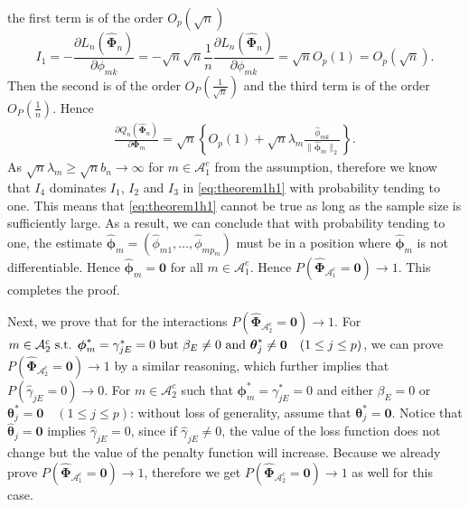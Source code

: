 \documentclass[a4paper,fleqn]{cas-sc}
\newcommand{\Op}{O_{P}}
\newcommand{\ddd}{,\ldots,}
\newcommand{\btheta}{\boldsymbol{\theta}}
\newcommand{\A}{\mathcal{A}}
\begin{document}
{	the first term is of the order $O_{p}(\sqrt{n})$
	\[
	I_{1}=-\frac{\partial L_{n}\left(\widehat{\boldsymbol{\Phi}}_{n}\right)}{\partial\phi_{mk}}=-\sqrt{n}\sqrt{n}\frac{1}{n}\frac{\partial L_{n}\left(\widehat{\boldsymbol{\Phi}}_{n}\right)}{\partial\phi_{mk}}=\sqrt{n}O_{p}(1)=O_{p}(\sqrt{n}).
	\]
	Then the second is of the order $\Op\left(\frac{1}{\sqrt{n}}\right)$
	and the third term is of the order $\Op\left(\frac{1}{n}\right)$.
	Hence
	\begin{align}
	\frac{\partial Q_{n}\left(\widehat{\boldsymbol{\Phi}}_{n}\right)}{\partial\boldsymbol{\Phi}_{m}}=\sqrt{n}\left\{ O_{p}(1)+\sqrt{n}\lambda_{m}\frac{\hat{\phi}_{mk}}{\|\widehat{\boldsymbol{\phi}}_{m}\|_{2}}\right\} .\label{eq:theorem1h1}
	\end{align}
	As $\sqrt{n}\lambda_{m}\geq\sqrt{n}b_{n}\to\infty$ for $m\in\mathcal{A}_{1}^{c}$
	from the assumption, therefore we know that $I_{4}$ dominates $I_{1}$,
	$I_{2}$ and $I_{3}$ in \eqref{eq:theorem1h1} with probability tending
	to one. This means that \eqref{eq:theorem1h1} cannot be true as long
	as the sample size is sufficiently large. As a result, we can conclude
	that with probability tending to one, the estimate $\widehat{\boldsymbol{\phi}}_{m}=(\hat{\phi}_{m1}\ddd\hat{\phi}_{mp_{m}})$
	must be in a position where $\widehat{\boldsymbol{\phi}}_{m}$ is
	not differentiable. Hence $\widehat{\boldsymbol{\phi}}_{m}=\mathbf{0}$
	for all $m\in\A_{1}^{c}$. Hence $P\left(\widehat{\boldsymbol{\Phi}}_{\mathcal{\A}_{1}^{c}}=\mathbf{0}\right)\rightarrow1$.
	This completes the proof. }{\normalsize\par}

{\normalsize{}Next, we prove that for the interactions $P\left(\widehat{\boldsymbol{\Phi}}_{\mathcal{\A}_{2}^{c}}=\mathbf{0}\right)\rightarrow1$.
	For $m\in\A_{2}^{c}\text{ s.t. }\text{\ensuremath{\boldsymbol{\phi}_{m}^{*}}}=\gamma_{jE}^{*}=0\text{ but }\beta_{E}\neq0\text{ and }\btheta_{j}^{*}\neq\mathbf{0}\quad(1\leq j\leq p)$,
	we can prove $P\left(\widehat{\boldsymbol{\Phi}}_{\mathcal{\A}_{2}^{c}}=\mathbf{0}\right)\rightarrow1$
	by a similar reasoning, which further implies that $P(\hat{\gamma}_{jE}=0)\rightarrow0$.
	For $m\in\A_{2}^{c}$ such that $\boldsymbol{\phi}_{m}^{*}=\gamma_{jE}^{*}=0$
	and either $\beta_{E}=0$ or $\btheta_{j}^{*}=\mathbf{0}\quad(1\leq j\leq p)$:
	without loss of generality, assume that $\btheta_{j}^{*}=\mathbf{0}$.
	Notice that $\hat{\btheta}_{j}=\mathbf{0}$ implies $\hat{\gamma}_{jE}=0$,
	since if $\hat{\gamma}_{jE}\neq0$, the value of the loss function
	does not change but the value of the penalty function will increase.
	Because we already prove $P\left(\widehat{\boldsymbol{\Phi}}_{\mathcal{\A}_{1}^{c}}=\mathbf{0}\right)\rightarrow1$,
	therefore we get $P\left(\widehat{\boldsymbol{\Phi}}_{\mathcal{\A}_{2}^{c}}=\mathbf{0}\right)\rightarrow1$
	as well for this case.}{\normalsize\par}
\end{document}
